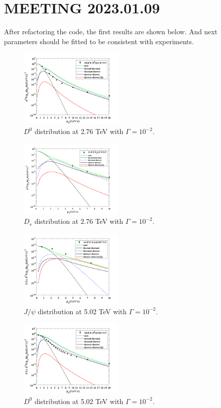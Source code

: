 \documentclass[twocolumn,aps,superscriptaddress,nofootinbib,floatfix]{revtex4}
\begin{document}
\section{MEETING 2023.01.09}
After refactoring the code, the first results are shown below. And next parameters should be fitted to be consistent with experiments.
\begin{figure}[H]
	\includegraphics[width=0.45\textwidth]{D0276_230109.png}
	\caption{$D^0$ distribution at 2.76 TeV with $\Gamma=10^{-2}$. }
	\label{fig38}
\end{figure}
\begin{figure}[H]
	\includegraphics[width=0.45\textwidth]{Ds276_230109.png}
	\caption{$D_s$ distribution at 2.76 TeV with $\Gamma=10^{-2}$. }
	\label{fig39}
\end{figure}
\begin{figure}[H]
	\includegraphics[width=0.45\textwidth]{Jpsi502_230109.png}
	\caption{$J/\psi$ distribution at 5.02 TeV with $\Gamma=10^{-2}$. }
	\label{fig40}
\end{figure}
\begin{figure}[H]
	\includegraphics[width=0.45\textwidth]{D0502_230109.png}
	\caption{$D^0$ distribution at 5.02 TeV with $\Gamma=10^{-2}$. }
	\label{fig41}
\end{figure}
\end{document}
